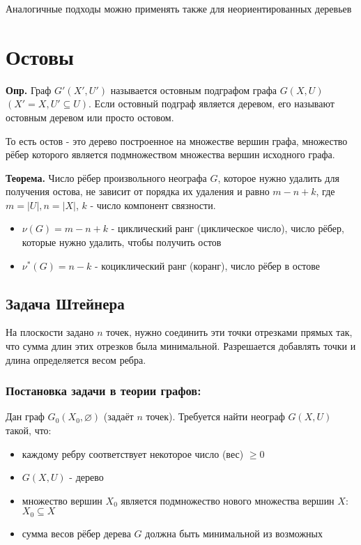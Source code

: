 \documentclass[10pt]{article}
\begin{document}
\par Аналогичные подходы можно применять также для неориентированных деревьев


\section*{Остовы}
\par\textbf{Опр.} Граф $G'(X', U')$ называется остовным подграфом графа $G(X, U)$ $(X' = X, U' \subseteq U)$. Если остовный подграф является деревом, его называют остовным деревом или просто остовом.
\par То есть остов - это дерево построенное на множестве вершин графа, множество рёбер которого является подмножеством множества вершин исходного графа.
\par\textbf{Теорема.} Число рёбер произвольного неографа $G$, которое нужно удалить для получения остова, не зависит от порядка их удаления и равно $m - n + k$, где $m = |U|, n = |X|$, $k$ - число компонент связности.
\begin{itemize}
    \item $\nu(G) = m - n + k$ - циклический ранг (циклическое число), число рёбер, которые нужно удалить, чтобы получить остов
    \item $\nu^*(G) = n - k$ - коциклический ранг (коранг), число рёбер в остове
\end{itemize}

\subsection*{Задача Штейнера}
\par На плоскости задано $n$ точек, нужно соединить эти точки отрезками прямых так, что сумма длин этих отрезков была минимальной. Разрешается добавлять точки и длина определяется весом ребра.
\subsubsection*{Постановка задачи в теории графов:}
\par Дан граф $G_{0}(X_{0}, \varnothing)$ (задаёт $n$ точек). Требуется найти неограф $G(X, U)$ такой, что:
\begin{itemize}
    \item каждому ребру соответствует некоторое число (вес) $\geq 0$
    \item $G(X, U)$ - дерево
    \item множество вершин $X_{0}$ является подмножество нового множества вершин $X$: $X_{0} \subseteq X$
    \item сумма весов рёбер дерева $G$ должна быть минимальной из возможных
\end{itemize}
\end{document}
